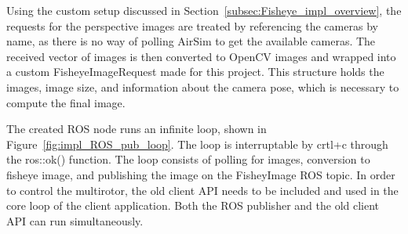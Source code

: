 Using the custom setup discussed in Section~\ref{subsec:Fisheye_impl_overview}, the requests for the perspective images are treated by referencing the cameras by name, as there is no way of polling AirSim to get the available cameras. The received vector of images is then converted to OpenCV images and wrapped into a custom FisheyeImageRequest made for this project. This structure holds the images, image size, and information about the camera pose, which is necessary to compute the final image.

The created ROS node runs an infinite loop, shown in Figure~\ref{fig:impl_ROS_pub_loop}. The loop is interruptable by crtl+c through the ros::ok() function. The loop consists of polling for images, conversion to fisheye image, and publishing the image on the FisheyImage ROS topic. In order to control the multirotor, the old client API needs to be included and used in the core loop of the client application. Both the ROS publisher and the old client API can run simultaneously.


\cleardoublepage